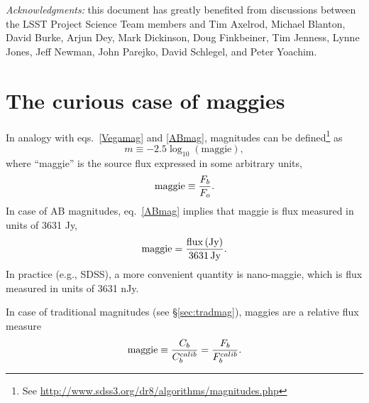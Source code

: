 \documentclass[DM,toc]{lsstdoc}
\begin{document}
\vskip 0.0in
\newpage
\textit{Acknowledgments:} this document has greatly benefited from discussions between
the LSST Project Science Team members and Tim Axelrod, Michael Blanton, David
Burke, Arjun Dey, Mark Dickinson, Doug Finkbeiner, Tim Jenness, Lynne Jones,  Jeff Newman,
John Parejko, David Schlegel, and Peter Yoachim.



\appendix

\section{The curious case of maggies}

In analogy with eqs.~\ref{Vegamag} and \ref{ABmag}, magnitudes can be defined\footnote{
See \url{http://www.sdss3.org/dr8/algorithms/magnitudes.php}} as
\begin{equation}
\label{maggie}
               m \equiv - 2.5\log_{10}\left(\mathrm{maggie}\right),
\end{equation}
where ``maggie'' is the source flux expressed in some arbitrary
units,
\begin{equation}
\label{maggie2}
               \mathrm{maggie} \equiv {F_b \over F_o}.
\end{equation}
In case of AB magnitudes, eq.~\ref{ABmag} implies that maggie is
flux measured in units of 3631 Jy,
\begin{equation}
\label{eq:defmaggie}
           \mathrm{maggie} = {\mathrm{flux \, (Jy)} \over \mathrm{3631 \, Jy}}.
\end{equation}
In practice (e.g., SDSS), a more convenient
quantity is nano-maggie, which is flux measured in units of 3631 nJy.

In case of traditional magnitudes (see \S\ref{sec:tradmag}), maggies are a
relative flux measure
\begin{equation}
\label{maggie3}
    \mathrm{maggie} \equiv {C_b  \over C_b^{calib}} = {F_b  \over F_b^{calib}}.
\end{equation}
\end{document}
